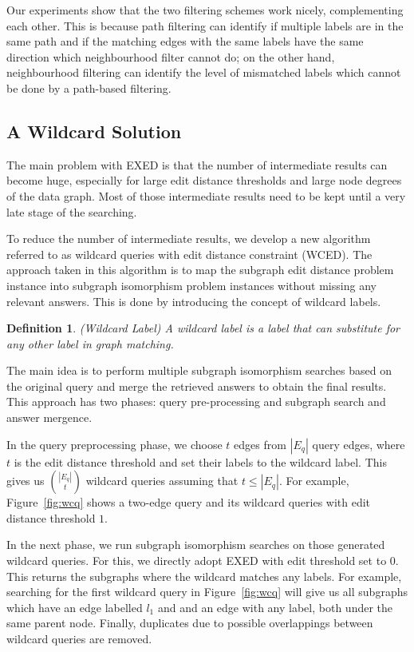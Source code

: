 \documentclass{sigmod}
\newtheorem{definition}{Definition}
\begin{document}
Our experiments show that the two filtering schemes work nicely, complementing each other. This is because path filtering can identify if multiple labels are in the same path and if the matching edges with the same labels have the same direction which neighbourhood filter cannot do; on the other hand, neighbourhood filtering can identify the level of mismatched labels which cannot be done by a path-based filtering.
\subsection{A Wildcard Solution}
The main problem with EXED is that the number of intermediate results can become huge, especially for large edit distance thresholds and large node degrees of the data graph. Most of those intermediate results need to be kept until a very late stage of the searching.  

To reduce the number of intermediate results, we develop a new algorithm referred to as wildcard queries with edit distance constraint (WCED). The approach taken in this algorithm is to map the subgraph edit distance problem instance into subgraph isomorphism problem instances without missing any relevant answers. This is done by introducing the concept of wildcard labels. 
\begin{definition}{(Wildcard Label)}
A wildcard label is a label that can substitute for any other label in graph matching.
\end{definition}

The main idea is to perform multiple subgraph isomorphism searches based on the original query and merge the retrieved answers to obtain the final results. This approach has two phases: query pre-processing and subgraph search and answer mergence. 

In the query preprocessing phase, we choose $t$ edges from $|E_q|$ query edges, where $t$ is the edit distance threshold and set their labels to the wildcard label. This gives us ${|E_q| \choose t}$ wildcard queries assuming that $t \leq |E_q|$. For example, Figure~\ref{fig:wcq} shows a two-edge query and its wildcard queries with edit distance threshold $1$. 

In the next phase, we run subgraph isomorphism searches on those generated wildcard queries. For this, we directly adopt EXED with edit threshold set to $0$. This returns the subgraphs where the wildcard matches any labels. For example, searching for the first wildcard query in Figure~\ref{fig:wcq} will give us all subgraphs which have an edge labelled $l_1$ and and an edge with any label, both under the same parent node. Finally, duplicates due to possible overlappings between wildcard queries are removed. 
\end{document}
